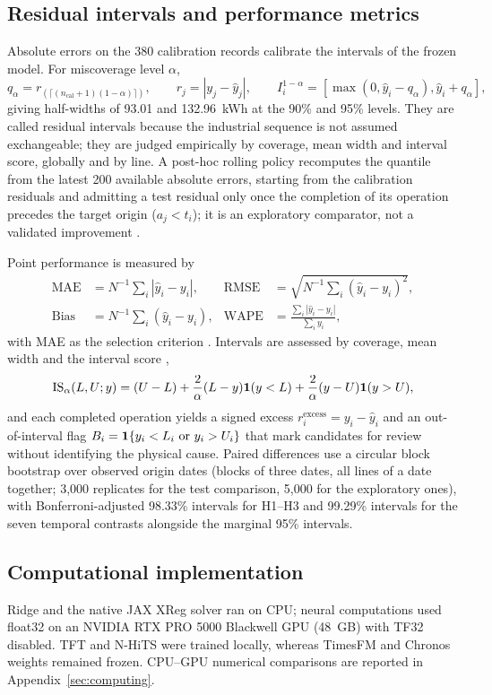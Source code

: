 \subsection{Residual intervals and performance metrics}
Absolute errors on the 380 calibration records calibrate the intervals of the frozen model. For miscoverage level $\alpha$,
\begin{equation}
 q_\alpha=r_{(\lceil(n_{\mathrm{cal}}+1)(1-\alpha)\rceil)},\qquad
 r_j=|y_j-\widehat y_j|,\qquad
 I_i^{1-\alpha}=[\max(0,\widehat y_i-q_\alpha),\widehat y_i+q_\alpha],
 \label{eq:interval}
\end{equation}
giving half-widths of 93.01 and 132.96~kWh at the 90\% and 95\% levels. They are called residual intervals because the industrial sequence is not assumed exchangeable; they are judged empirically by coverage, mean width and interval score, globally and by line. A post-hoc rolling policy recomputes the quantile from the latest 200 available absolute errors, starting from the calibration residuals and admitting a test residual only once the completion of its operation precedes the target origin ($a_j<t_i$); it is an exploratory comparator, not a validated improvement \citep{xu2021,zaffran2022,gibbs2024}.

Point performance is measured by
\begin{align}
 \mathrm{MAE}&=N^{-1}\sum_i|\widehat y_i-y_i|,&
 \mathrm{RMSE}&=\sqrt{N^{-1}\sum_i(\widehat y_i-y_i)^2},\\
 \mathrm{Bias}&=N^{-1}\sum_i(\widehat y_i-y_i),&
 \mathrm{WAPE}&=\frac{\sum_i|\widehat y_i-y_i|}{\sum_i y_i},
\end{align}
with MAE as the selection criterion \citep{hyndman2006}. Intervals are assessed by coverage, mean width and the interval score \citep{gneiting2007},
\begin{equation}
 \mathrm{IS}_\alpha(L,U;y)=(U-L)+\frac{2}{\alpha}(L-y)\mathbf{1}(y<L)
                  +\frac{2}{\alpha}(y-U)\mathbf{1}(y>U),
 \label{eq:is}
\end{equation}
and each completed operation yields a signed excess $r_i^{\mathrm{excess}}=y_i-\widehat y_i$ and an out-of-interval flag $B_i=\ind\{y_i<L_i\ \text{or}\ y_i>U_i\}$ that mark candidates for review without identifying the physical cause. Paired differences use a circular block bootstrap over observed origin dates (blocks of three dates, all lines of a date together; 3,000 replicates for the test comparison, 5,000 for the exploratory ones), with Bonferroni-adjusted 98.33\% intervals for H1--H3 and 99.29\% intervals for the seven temporal contrasts alongside the marginal 95\% intervals.

\subsection{Computational implementation}
Ridge and the native JAX XReg solver ran on CPU; neural computations used float32 on an NVIDIA RTX PRO 5000 Blackwell GPU (48~GB) with TF32 disabled. TFT and N-HiTS were trained locally, whereas TimesFM and Chronos weights remained frozen. CPU--GPU numerical comparisons are reported in Appendix~\ref{sec:computing}.
